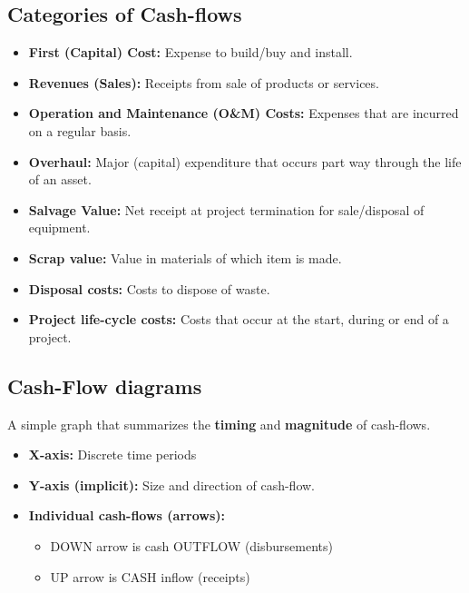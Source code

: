 \subsection{Categories of Cash-flows}
\begin{terminology}
    \begin{itemize}
        \item \textbf{First (Capital) Cost:} Expense to build/buy and install.
        \item \textbf{Revenues (Sales):} Receipts from sale of products or services.
        \item \textbf{Operation and Maintenance (O\&M) Costs:} Expenses that are incurred on a regular basis. 
        \item \textbf{Overhaul:} Major (capital) expenditure that occurs part way through the life of an asset. 
        \item \textbf{Salvage Value:} Net receipt at project termination for sale/disposal of equipment.
        \item \textbf{Scrap value:} Value in materials of which item is made.
        \item \textbf{Disposal costs:} Costs to dispose of waste.
        \item \textbf{Project life-cycle costs:} Costs that occur at the start, during or end of a project. 
    \end{itemize}
\end{terminology}

\subsection{Cash-Flow diagrams}
\begin{definition}
    A simple graph that summarizes the \textbf{timing} and \textbf{magnitude} of cash-flows.
    \begin{itemize}
        \item \textbf{X-axis:} Discrete time periods
        \item \textbf{Y-axis (implicit):} Size and direction of cash-flow.
        \item \textbf{Individual cash-flows (arrows):} 
            \begin{itemize}
                \item DOWN arrow is cash OUTFLOW (disbursements)
                \item UP arrow is CASH inflow (receipts)
            \end{itemize}
    \end{itemize}
\end{definition}
    
